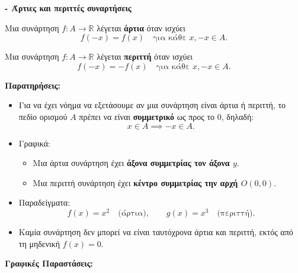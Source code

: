 {\large \textbf{- Άρτιες και περιττές συναρτήσεις}}
\vspace{1em}

Μια συνάρτηση $f: A \to \mathbb{R}$ λέγεται \textbf{άρτια} όταν ισχύει
\[
f(-x) = f(x) \quad \text{για κάθε } x, -x \in A.
\]

\vspace{1em}

Μια συνάρτηση $f: A \to \mathbb{R}$ λέγεται \textbf{περιττή} όταν ισχύει
\[
f(-x) = -f(x) \quad \text{για κάθε } x, -x \in A.
\]

\vspace{1em}

\textbf{Παρατηρήσεις:}
\begin{itemize}
  \item Για να έχει νόημα να εξετάσουμε αν μια συνάρτηση είναι άρτια ή περιττή, το πεδίο ορισμού $A$ πρέπει να είναι \textbf{συμμετρικό} ως προς το $0$, δηλαδή:
  \[
  x \in A \implies -x \in A.
  \]
  \item Γραφικά:
  \begin{itemize}
    \item Μια άρτια συνάρτηση έχει \textbf{άξονα συμμετρίας τον άξονα $y$}.
    \item Μια περιττή συνάρτηση έχει \textbf{κέντρο συμμετρίας την αρχή $O(0,0)$}.
  \end{itemize}
  \item Παραδείγματα:
  \[
  f(x) = x^2 \quad \text{(άρτια)}, \qquad g(x) = x^3 \quad \text{(περιττή)}.
  \]
  \item Καμία συνάρτηση δεν μπορεί να είναι ταυτόχρονα άρτια και περιττή, εκτός από τη μηδενική $f(x)=0$.
\end{itemize}

\textbf{Γραφικές Παραστάσεις:}

